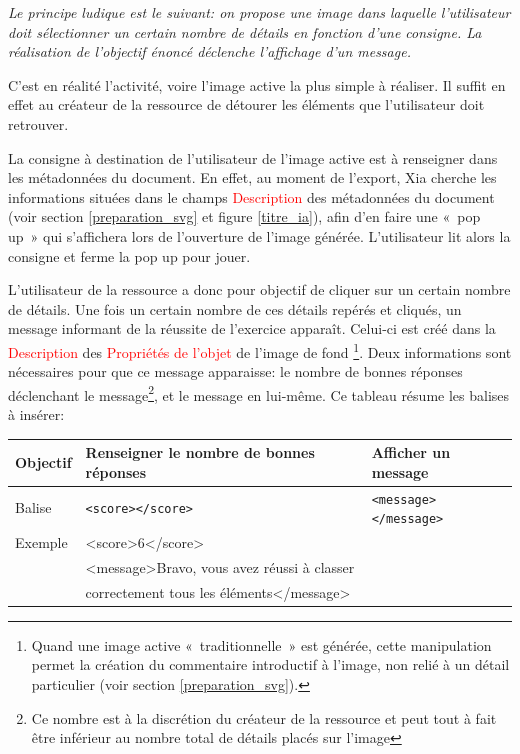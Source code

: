 \documentclass[a4paper,12pt]{report}
\newcommand{\chemin}[1]{\textcolor{red}{#1}}
\begin{document}
\textit{Le principe ludique est le suivant: on propose une image dans laquelle l'utilisateur 
doit sélectionner un certain nombre de détails en fonction d'une consigne. 
La réalisation de l'objectif énoncé déclenche l'affichage d'un message.}

C'est en réalité l'activité, voire l'image active la plus simple à réaliser. Il suffit en effet 
au créateur de la ressource de détourer les éléments que l'utilisateur doit retrouver.

La consigne à destination de l'utilisateur de l'image active est à renseigner 
dans les métadonnées du document. En effet, au moment de l'export, Xia cherche les informations
situées dans le champs \chemin{Description} des métadonnées du document 
(voir section \ref{preparation_svg} et figure \ref{titre_ia}), afin d'en faire une «~pop up~»
qui s'affichera lors de l'ouverture de l'image générée. L'utilisateur lit alors la consigne et ferme
la pop up pour jouer.

L'utilisateur de la ressource a donc pour objectif de cliquer sur un certain nombre de détails.
Une fois un certain nombre de ces détails repérés et cliqués, un message informant de la réussite de l'exercice
apparaît. Celui-ci est créé dans la \chemin{Description} des \chemin{Propriétés de l'objet} de l'image de fond
\footnote{Quand une image active «~traditionnelle~» est générée, cette manipulation
permet la création du commentaire introductif à l'image, non relié à un détail particulier
(voir section \ref{preparation_svg}).}. 
Deux informations sont nécessaires pour que ce message apparaisse:
le nombre de bonnes réponses déclenchant le message\footnote{Ce nombre est à la discrétion
du créateur de la ressource et peut tout à fait être inférieur au nombre total de détails placés sur l'image},
et le message en lui-même. Ce tableau résume les balises à insérer:

\begin{center}
 \begin{tabular}{|l|p{2in}|p{2in}|}
 \hline
  Objectif & Renseigner le nombre de bonnes réponses & Afficher un message\\
  \hline
  Balise & \verb|<score></score>| & \verb|<message></message>|\\
  \hline
  Exemple & \multicolumn{2}{|l|}{<score>6</score>}\\
   & \multicolumn{2}{|l|}{<message>Bravo, vous avez réussi à classer}\\
    & \multicolumn{2}{|l|}{correctement tous les éléments</message>}\\
  \hline
 \end{tabular}
\end{center}
\end{document}
